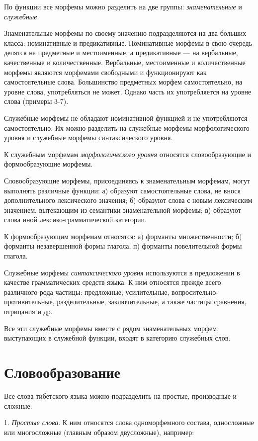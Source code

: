 По функции все морфемы можно разделить на две группы: \emph{знаменательные} и \emph{служебные}.

Знаменательные морфемы по своему значению подразделяются на два больших класса: номинативные и предикативные. Номинативные морфемы в свою очередь делятся на предметные и местоименные, а предикативные --- на вербальные, качественные и количественные. Вербальные, местоименные и количественные морфемы являются морфемами свободными и функционируют как самостоятельные слова. Большинство предметных морфем самостоятельно, на уровне слова, употребляться не может. Однако часть их употребляется на уровне слова (примеры 3-7).

Служебные морфемы не обладают номинативной функцией и не употребляются самостоятельно. Их можно разделить на служебные морфемы морфологического уровня и служебные морфемы синтаксического уровня.

К служебным морфемам \emph{морфологического уровня} относятся словообразующие и формообразующие морфемы.

Словообразующие морфемы, присоединяясь к знаменательным морфемам, могут выполнять различные функции: а) образуют самостоятельные слова, не внося дополнительного лексического значения; б) образуют слова с новым лексическим значением, вытекающим из семантики знаменательной морфемы; в) образуют слова иной лексико-грамматической категории.

К формообразующим морфемам относятся: а) форманты множественности; б) форманты незавершенной формы глагола; п) форманты повелительной формы глагола.

Служебные морфемы \emph{синтаксического уровня} используются в предложении в качестве грамматических средств языка. К ним относятся прежде всего различного рода частицы: предложные, усилительные, вопросительно-противительные, разделительные, заключительные, а также частицы сравнения, отрицания и др.

Все эти служебные морфемы вместе с рядом знаменательных морфем, выступающих в служебной функции, входят в категорию служебных слов.

\section{Словообразование}

Все слова тибетского языка можно подразделить на простые, производные и сложные.

1. \emph{Простые слова}. К ним относятся слова одноморфемного состава, односложные или многосложные (главным образом двусложные), например:

